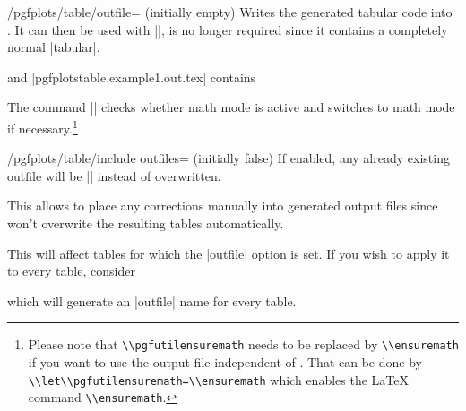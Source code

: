 \begin{key}{/pgfplots/table/outfile= (initially empty)}
\label{page:outfile}
    Writes the generated tabular code into . It can then be
    used with ||, \PGFPlotstable{} is no longer required
    since it contains a completely normal |tabular|.
\begin{codeexample}[pre={\begin{lateximage}},post={\end{lateximage}}]
\end{codeexample}
    and |pgfplotstable.example1.out.tex| contains
    

    The command |\pgfutilensuremath| checks whether math mode is active and
    switches to math mode if necessary.\footnote{Please note that
    \lstinline{\\pgfutilensuremath} needs to be replaced by
    \lstinline{\\ensuremath} if you want to use the output file independent of
    \PGF{}. That can be done by \lstinline{\\let\\pgfutilensuremath=\\ensuremath}
    which enables the \LaTeX{} command \lstinline{\\ensuremath}.}
\end{key}

\begin{key}{/pgfplots/table/include outfiles= (initially false)}
    If enabled, any already existing outfile will be || instead of
    overwritten.
\begin{codeexample}
\end{codeexample}
    This allows to place any corrections manually into generated output files
    since \PGFPlotstable{} won't overwrite the resulting tables automatically.

    This will affect tables for which the |outfile| option is set. If you wish
    to apply it to every table, consider
\begin{codeexample}
\end{codeexample}
    \noindent which will generate an |outfile| name for every table.
\end{key}

